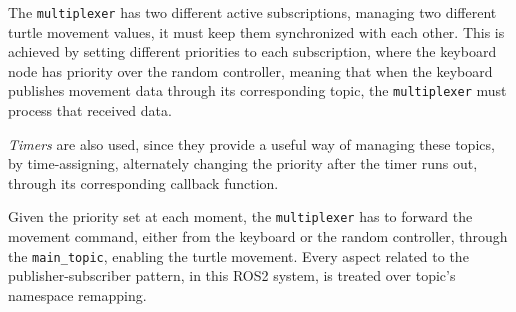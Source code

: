 

The \texttt{multiplexer} has two different active subscriptions, managing two different turtle movement values, it must keep them synchronized with each other. This is achieved by setting different priorities to each subscription, where the keyboard node has priority over the random controller, meaning that when the keyboard publishes movement data through its corresponding topic, the \texttt{multiplexer} must process that received data. 

\textit{Timers} are also used, since they provide a useful way of managing these topics, by time-assigning, alternately changing the priority after the timer runs out, through its corresponding callback function.


Given the priority set at each moment, the \texttt{multiplexer} has to forward the movement command, either from the keyboard or the random controller, through the \texttt{main\_topic}, enabling the turtle movement. Every aspect related to the publisher-subscriber pattern, in this ROS2 system, is treated over topic's namespace remapping. %

